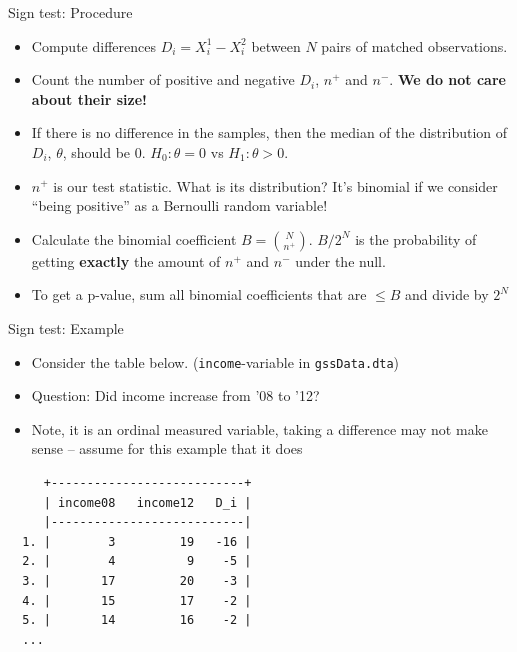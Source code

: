\documentclass[xcolor=table,dvipsnames]{beamer}
\begin{document}
\begin{frame}{Sign test: Procedure}
\begin{itemize}
\item Compute differences $D_i = X_i^1 - X_i^2$ between $N$ pairs of matched observations. 
\item Count the number of positive and negative $D_i$, $n^+$ and $n^-$. \textbf{We do not care about their size!} \pause
\item If there is no difference in the samples, then the median of the distribution of $D_i$, $\theta$, should be 0. $H_0:\theta = 0$ vs $H_1:\theta>0$. \pause
\item $n^+$ is our test statistic. What is its distribution? It's binomial if we consider ``being positive'' as a Bernoulli random variable! \pause
\item Calculate the binomial coefficient $B={N\choose n^+}$. $B/2^N$ is the probability of getting \textbf{exactly} the amount of $n^+$ and $n^-$ under the null.
\item To get a p-value, sum all binomial coefficients that are $\leq B$ and divide by $2^N$
\end{itemize}	
\end{frame}

\begin{frame}[fragile]{Sign test: Example}
\begin{itemize}
\item Consider the table below. (\texttt{income}-variable in \texttt{gssData.dta}) \pause
\item Question: Did income increase from '08 to '12?
\item Note, it is an ordinal measured variable, taking a difference may not make sense -- assume for this example that it does \pause
\end{itemize}
	
\begin{verbatim}
     +---------------------------+
     | income08   income12   D_i |
     |---------------------------|
  1. |        3         19   -16 |
  2. |        4          9    -5 |
  3. |       17         20    -3 |
  4. |       15         17    -2 |
  5. |       14         16    -2 |
  ...
\end{verbatim}
\end{frame}
\end{document}
